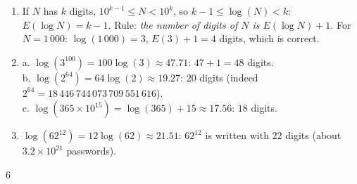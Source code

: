 {\begin{enumerate}
\begin{enumerate}[label=\alph*.]
\item $E(\log N)=14$, and $14+1=15$ digits.
\end{enumerate}
\item If $N$ has $k$ digits, $10^{k-1}\leqslant N<10^k$, so $k-1\leqslant\log(N)<k$: $E(\log N)=k-1$. Rule: \emph{the number of digits of $N$ is $E(\log N)+1$}. For $N=1\,000$: $\log(1\,000)=3$, $E(3)+1=4$ digits, which is correct.
\item a. $\log(3^{100})=100\log(3)\approx47.71$: $47+1=48$ digits.\\
b. $\log(2^{64})=64\log(2)\approx19.27$: $20$ digits (indeed $2^{64}=18\,446\,744\,073\,709\,551\,616$).\\
c. $\log(365\times10^{15})=\log(365)+15\approx17.56$: $18$ digits.
\item $\log(62^{12})=12\log(62)\approx21.51$: $62^{12}$ is written with $22$ digits (about $3.2\times10^{21}$ passwords).
\end{enumerate}
}{6}

